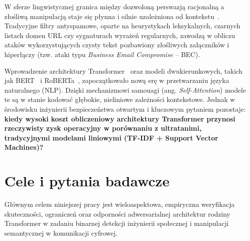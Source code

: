 \documentclass[12pt,a4paper,twoside]{report}
\begin{document}
W sferze lingwistycznej granica między dozwoloną perswazją racjonalną a złośliwą manipulacją staje się płynna i silnie uzależniona od kontekstu~\cite{safepersuasion2025,mentalmanip2024}. Tradycyjne filtry antyspamowe, oparte na heurystykach leksykalnych, czarnych listach domen URL czy sygnaturach wyrażeń regularnych, zawodzą w obliczu ataków wykorzystujących czysty tekst pozbawiony złośliwych załączników i hiperłączy (tzw. ataki typu \emph{Business Email Compromise} -- BEC).

Wprowadzenie architektury Transformer~\cite{vaswani2017} oraz modeli dwukierunkowych, takich jak BERT~\cite{devlin2019} i RoBERTa~\cite{liu2019}, zapoczątkowało nową erę w przetwarzaniu języka naturalnego (NLP). Dzięki mechanizmowi samouagi (ang. \emph{Self-Attention}) modele te są w stanie kodować głębokie, nieliniowe zależności kontekstowe. Jednak w środowisku inżynierii bezpieczeństwa otwartym i kluczowym pytaniem pozostaje: \textbf{kiedy wysoki koszt obliczeniowy architektury Transformer przynosi rzeczywisty zysk operacyjny w porównaniu z ultratanimi, tradycyjnymi modelami liniowymi (TF-IDF + Support Vector Machines)?}

\section{Cele i pytania badawcze}
Głównym celem niniejszej pracy jest wieloaspektowa, empiryczna weryfikacja skuteczności, ograniczeń oraz odporności adwersarialnej architektur rodziny Transformer w zadaniu binarnej detekcji inżynierii społecznej i manipulacji semantycznej w komunikacji cyfrowej.
\end{document}
